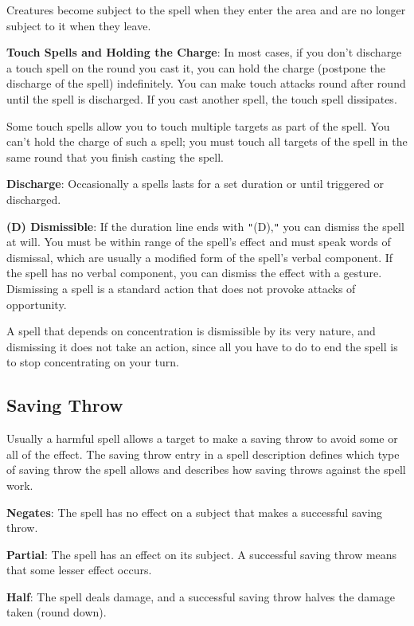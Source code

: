 Creatures become subject to the spell when they enter the area and are no longer subject to it when they leave.
				
\textbf{Touch Spells and Holding the Charge}: In most cases, if you don't discharge a touch spell on the round you cast it, you can hold the charge (postpone the discharge of the spell) indefinitely. You can make touch attacks round after round until the spell is discharged. If you cast another spell, the touch spell dissipates.
				
Some touch spells allow you to touch multiple targets as part of the spell. You can't hold the charge of such a spell; you must touch all targets of the spell in the same round that you finish casting the spell.
				
\textbf{Discharge}: Occasionally a spells lasts for a set duration or until triggered or discharged.
				
\textbf{(D) Dismissible}: If the duration line ends with \texttt{{}"{}}(D),\texttt{{}"{}} you can dismiss the spell at will. You must be within range of the spell's effect and must speak words of dismissal, which are usually a modified form of the spell's verbal component. If the spell has no verbal component, you can dismiss the effect with a gesture. Dismissing a spell is a standard action that does not provoke attacks of opportunity.
				
A spell that depends on concentration is dismissible by its very nature, and dismissing it does not take an action, since all you have to do to end the spell is to stop concentrating on your turn.
				
\subsection{Saving Throw}

				
Usually a harmful spell allows a target to make a saving throw to avoid some or all of the effect. The saving throw entry in a spell description defines which type of saving throw the spell allows and describes how saving throws against the spell work.
				
\textbf{Negates}: The spell has no effect on a subject that makes a successful saving throw.
				
\textbf{Partial}: The spell has an effect on its subject. A successful saving throw means that some lesser effect occurs.
				
\textbf{Half}: The spell deals damage, and a successful saving throw halves the damage taken (round down).
				
